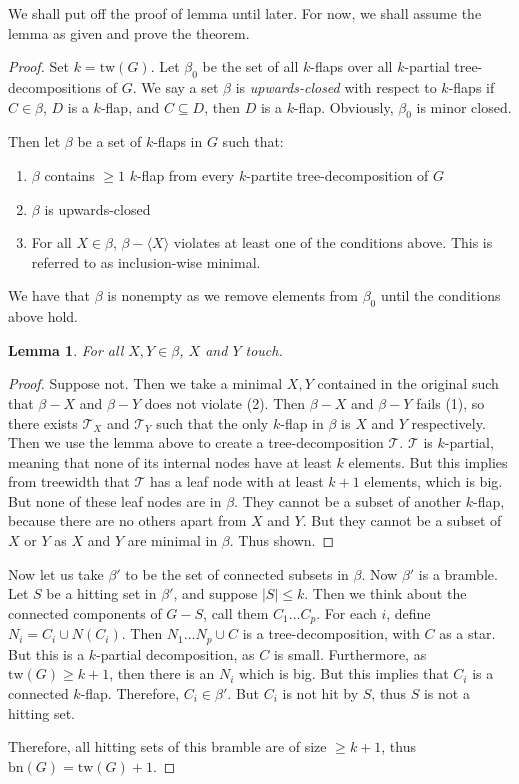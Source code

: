 \documentclass[]{article}
\newcommand{\tree}{\mathcal{T}}
\newcommand{\tw}{\text{tw}}
\newcommand{\bn}{\text{bn}}
\newtheorem{lemma}[theorem]{Lemma}
\theoremstyle{definition}
\numberwithin{theorem}{section}
\numberwithin{equation}{section}
\begin{document}
We shall put off the proof of lemma until later. For now, we shall assume the lemma as given and prove the theorem. 

\begin{proof}
	Set $k = \tw(G)$.
	Let $\beta_0$ be the set of all $k$-flaps over all $k$-partial tree-decompositions of $G$. We say a set $\beta$ is \textit{upwards-closed} with respect to $k$-flaps if $C \in \beta$, $D$ is a $k$-flap, and $C \subseteq D$, then $D$ is a $k$-flap. Obviously, $\beta_0$ is minor closed. 
	
	Then let $\beta$ be a set of $k$-flaps in $G$ such that:
	\begin{enumerate}
		\item $\beta$ contains $\geq 1$ $k$-flap from every $k$-partite tree-decomposition of $G$
		\item $\beta$ is upwards-closed
		\item For all $X \in \beta$, $\beta - \langle X \rangle$ violates at least one of the conditions above. This is referred to as inclusion-wise minimal.
	\end{enumerate}
	We have that $\beta$ is nonempty as we remove elements from $\beta_0$ until the conditions above hold. 
	
	\begin{lemma}
		For all $X, Y \in \beta$, $X$ and $Y$ touch.
	\end{lemma}
	\begin{proof}
	Suppose not. Then we take a minimal $X, Y$ contained in the original such that $\beta - X$ and $\beta - Y$ does not violate (2). Then $\beta - X$ and $\beta - Y$ fails (1), so there exists $\tree_X$ and $\tree_Y$ such that the only $k$-flap in $\beta$ is $X$ and $Y$ respectively. Then we use the lemma above to create a tree-decomposition $\tree$. $\tree$ is $k$-partial, meaning that none of its internal nodes have at least $k$ elements. But this implies from treewidth that $\tree$ has a leaf node with at least $k + 1$ elements, which is big. But none of these leaf nodes are in $\beta$. They cannot be a subset of another $k$-flap, because there are no others apart from $X$ and $Y$. But they cannot be a subset of $X$ or $Y$ as $X$ and $Y$ are minimal in $\beta$. Thus shown.
	\end{proof}
	Now let us take $\beta'$ to be the set of connected subsets in $\beta$. Now $\beta'$ is a bramble. Let $S$ be a hitting set in $\beta'$, and suppose $|S| \leq k$. Then we think about the connected components of $G - S$, call them $C_1 ... C_p$. For each $i$, define $N_i = C_i \cup N(C_i)$. Then $N_1 ... N_p \cup C$ is a tree-decomposition, with $C$ as a star. But this is a $k$-partial decomposition, as $C$ is small. Furthermore, as $\tw(G) \geq k + 1$, then there is an $N_i$ which is big. But this implies that $C_i$ is a connected $k$-flap. Therefore, $C_i \in \beta'$. But $C_i$ is not hit by $S$, thus $S$ is not a hitting set.
	
	Therefore, all hitting sets of this bramble are of size $\geq k + 1$, thus $\bn(G) = \tw(G) + 1$. 
\end{proof}
\end{document}

